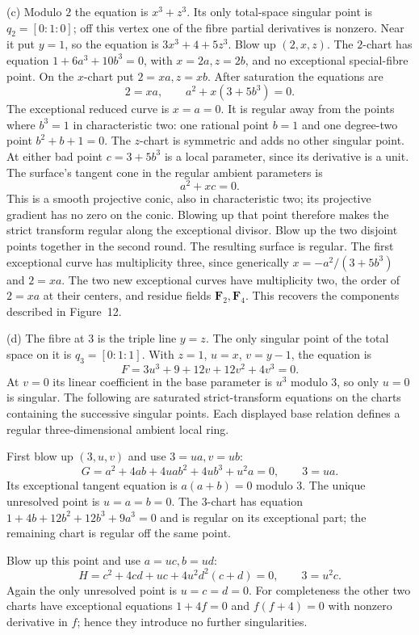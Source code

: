\documentclass[11pt]{article}
\begin{document}
(c) Modulo $2$ the equation is $x^3+z^3$. Its only total-space singular point is $q_2=[0:1:0]$; off this vertex one of the fibre partial derivatives is nonzero. Near it put $y=1$, so the equation is $3x^3+4+5z^3$. Blow up $(2,x,z)$. The $2$-chart has equation $1+6a^3+10b^3=0$, with $x=2a,z=2b$, and no exceptional special-fibre point. On the $x$-chart put $2=xa,z=xb$. After saturation the equations are
\[ 2=xa,\qquad a^2+x(3+5b^3)=0. \]
The exceptional reduced curve is $x=a=0$. It is regular away from the points where $b^3=1$ in characteristic two: one rational point $b=1$ and one degree-two point $b^2+b+1=0$. The $z$-chart is symmetric and adds no other singular point. At either bad point $c=3+5b^3$ is a local parameter, since its derivative is a unit. The surface's tangent cone in the regular ambient parameters is
\[ a^2+xc=0. \]
This is a smooth projective conic, also in characteristic two; its projective gradient has no zero on the conic. Blowing up that point therefore makes the strict transform regular along the exceptional divisor. Blow up the two disjoint points together in the second round. The resulting surface is regular. The first exceptional curve has multiplicity three, since generically $x=-a^2/(3+5b^3)$ and $2=xa$. The two new exceptional curves have multiplicity two, the order of $2=xa$ at their centers, and residue fields $\mathbf F_2,\mathbf F_4$. This recovers the components described in Figure~12.

(d) The fibre at $3$ is the triple line $y=z$. The only singular point of the total space on it is $q_3=[0:1:1]$. With $z=1$, $u=x$, $v=y-1$, the equation is
\[ F=3u^3+9+12v+12v^2+4v^3=0. \]
At $v=0$ its linear coefficient in the base parameter is $u^3$ modulo $3$, so only $u=0$ is singular. The following are saturated strict-transform equations on the charts containing the successive singular points. Each displayed base relation defines a regular three-dimensional ambient local ring.

First blow up $(3,u,v)$ and use $3=ua,v=ub$:
\[ G=a^2+4ab+4uab^2+4ub^3+u^2a=0,\qquad 3=ua. \]
Its exceptional tangent equation is $a(a+b)=0$ modulo $3$. The unique unresolved point is $u=a=b=0$. The $3$-chart has equation $1+4b+12b^2+12b^3+9a^3=0$ and is regular on its exceptional part; the remaining chart is regular off the same point.

Blow up this point and use $a=uc,b=ud$:
\[ H=c^2+4cd+uc+4u^2d^2(c+d)=0,\qquad 3=u^2c. \]
Again the only unresolved point is $u=c=d=0$. For completeness the other two charts have exceptional equations $1+4f=0$ and $f(f+4)=0$ with nonzero derivative in $f$; hence they introduce no further singularities.
\end{document}
